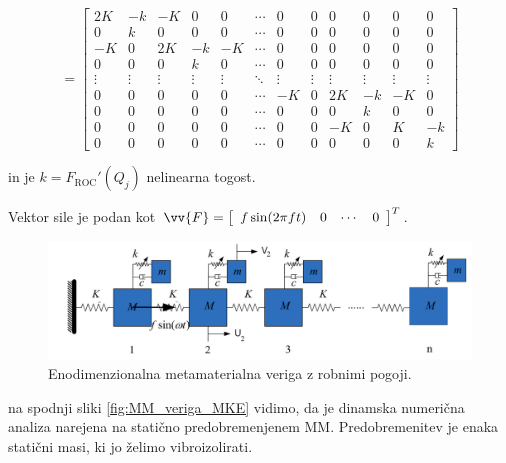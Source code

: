         \begin{equation}
            [K(Q_j)]=\left[\begin{array}{cccccccccccc}
            2 K & -k & -K & 0 & 0 & \cdots & 0 & 0 & 0 & 0 & 0 & 0 \\
            0 & k & 0 & 0 & 0 & \cdots & 0 & 0 & 0 & 0 & 0 & 0 \\
            -K & 0 & 2 K & -k & -K & \cdots & 0 & 0 & 0 & 0 & 0 & 0 \\
            0 & 0 & 0 & k & 0 & \cdots & 0 & 0 & 0 & 0 & 0 & 0 \\
            \vdots & \vdots & \vdots & \vdots & \vdots & \ddots & \vdots & \vdots & \vdots & \vdots & \vdots & \vdots \\
            0 & 0 & 0 & 0 & 0 & \cdots & -K & 0 & 2 K & -k & -K & 0 \\
            0 & 0 & 0 & 0 & 0 & \cdots & 0 & 0 & 0 & k & 0 & 0 \\
            0 & 0 & 0 & 0 & 0 & \cdots & 0 & 0 & -K & 0 & K & -k \\
            0 & 0 & 0 & 0 & 0 & \cdots & 0 & 0 & 0 & 0 & 0 & k
            \end{array}\right]
        \end{equation}

        in je $k=F_{\text{ROC}}'(Q_j)$ nelinearna togost. 
        
        Vektor sile je podan kot $\vv{F}=\left[\begin{array}{llll}f \sin (2\pi f t) & 0 & \cdots & 0\end{array}\right]^T$.

        \newpage
        \begin{figure}[!hb]
            \centering
            \includegraphics[scale=0.59]{slike/metodologija/MM_veriga_2.png}
            \caption{Enodimenzionalna metamaterialna veriga z robnimi pogoji.}\label{fig:MM_veriga_2}
        \end{figure}

        na spodnji sliki \ref{fig:MM_veriga_MKE} vidimo, da je dinamska numerična analiza narejena na statično predobremenjenem MM. Predobremenitev je enaka statični masi, ki jo želimo vibroizolirati. 


